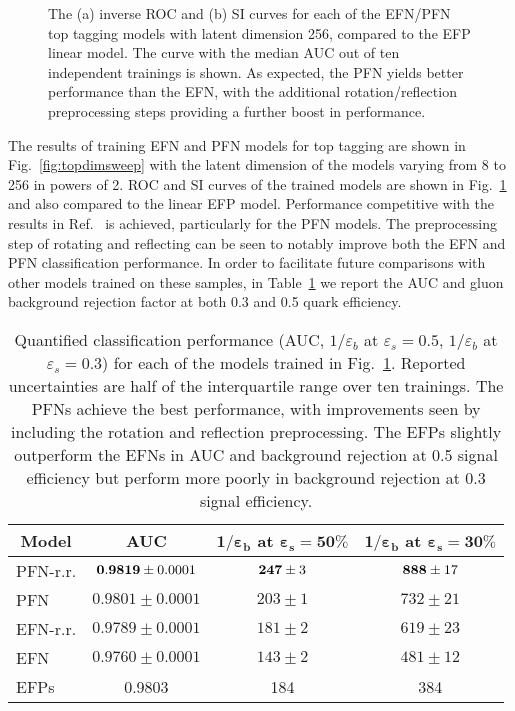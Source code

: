 \documentclass[letterpaper,11pt]{article}
\DeclareRobustCommand{\Tab}[1]{Table~\ref{#1}}
\DeclareRobustCommand{\Fig}[1]{Fig.~\ref{#1}}
\DeclareRobustCommand{\Ref}[1]{Ref.~\cite{#1}}
\begin{document}
\begin{figure}[t]
\centering
{}
\caption{The (a) inverse ROC and (b) SI curves for each of the EFN/PFN top tagging models with latent dimension 256, compared to the EFP linear model.
%
The curve with the median AUC out of ten independent trainings is shown.
%
As expected, the PFN yields better performance than the EFN, with the additional rotation/reflection preprocessing steps providing a further boost in performance.}
\label{fig:toproccomp}
\end{figure}



The results of training EFN and PFN models for top tagging are shown in \Fig{fig:topdimsweep} with the latent dimension of the models varying from 8 to 256 in powers of 2.
%
ROC and SI curves of the trained models are shown in \Fig{fig:toproccomp} and also compared to the linear EFP model.
%
Performance competitive with the results in \Ref{Butter:2017cot} is achieved, particularly for the PFN models.
%
The preprocessing step of rotating and reflecting can be seen to notably improve both the EFN and PFN classification performance.
%
In order to facilitate future comparisons with other models trained on these samples, in \Tab{tab:topstats} we report the AUC and gluon background rejection factor at both 0.3 and 0.5 quark efficiency.


\begin{table}[t]
\centering
\begin{tabular}{|l|c|c|c|}
\hline
\multicolumn{1}{|c|}{\textbf{Model}}  & {\bf AUC} & {\bf $\boldsymbol{1/\varepsilon_b}$ at  $\boldsymbol{\varepsilon_s=50\%}$} & {\bf $\boldsymbol{1/\varepsilon_b}$ at  $\boldsymbol{\varepsilon_s=30\%}$} \\
\hline \hline
PFN-r.r. & ${\bf 0.9819}\pm0.0001$ & ${\bf 247}\pm3$ & ${\bf 888}\pm17$\\
PFN & $0.9801\pm0.0001$ & $203\pm1$ & $732\pm21$\\
\hline
EFN-r.r. & $0.9789\pm0.0001$ & $181\pm2$ & $619\pm23$\\ 
EFN & $0.9760\pm0.0001$ & $143\pm2$ & $481\pm12$\\ 
\hline
EFPs & 0.9803 & 184 & 384\\
\hline
\end{tabular}
\caption{Quantified classification performance (AUC, $1/\varepsilon_b$ at $\varepsilon_s=0.5$, $1/\varepsilon_b$ at $\varepsilon_s=0.3$) for each of the models trained in \Fig{fig:toproccomp}.
%
Reported uncertainties are half of the interquartile range over ten trainings.
%
The PFNs achieve the best performance, with improvements seen by including the rotation and reflection preprocessing.
%
The EFPs slightly outperform the EFNs in AUC and background rejection at 0.5 signal efficiency but perform more poorly in background rejection at 0.3 signal efficiency.}
\label{tab:topstats}
\end{table}
\end{document}
